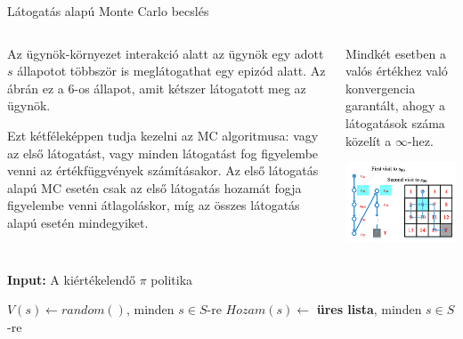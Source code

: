 \documentclass[english, aspectratio=169]{beamer}
\begin{document}
\begin{frame}{Látogatás alapú Monte Carlo becslés}
\begin{columns}
\begin{column}{.5\textwidth}
Az ügynök-környezet interakció alatt az ügynök egy adott $s$ állapotot többször is meglátogathat egy epizód alatt. Az ábrán ez a $6$-os állapot, amit kétszer látogatott meg az ügynök. \par\smallskip 
Ezt kétféleképpen tudja kezelni az MC algoritmusa: vagy az első látogatást, vagy minden látogatást fog figyelembe venni az értékfüggvények számításakor. Az első látogatás alapú MC esetén csak az első látogatás hozamát fogja figyelembe venni átlagoláskor, míg az összes látogatás alapú esetén mindegyiket.
\end{column}
\begin{column}{.5\textwidth}
Mindkét esetben a valós értékhez való konvergencia garantált, ahogy a látogatások száma közelít a $\infty$-hez. 
\begin{center}
\includegraphics[width=7cm, keepaspectratio]{images/mc_td_6.png}
\end{center}
\end{column}
\end{columns}
\end{frame}

\begin{frame}{}
\begin{algorithm}[H]
\caption{Első látogatás alapú Monte Carlo algoritmus $V_{\pi}$ becslésére}
\SetAlgoLined
\textbf{Input:} A kiértékelendő $\pi$ politika\par\smallskip
$V(s) \leftarrow random()$, minden $s \in S$-re\;
$Hozam(s) \leftarrow $ \textbf{üres lista}, minden $s \in S$-re\; 
\end{algorithm}
\end{frame}
\end{document}
